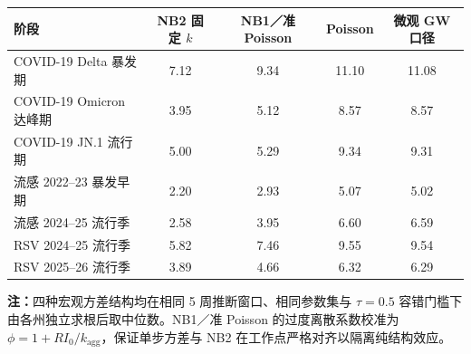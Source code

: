\begin{tabular}{lcccc}
\toprule
阶段 & NB2 固定 $k$ & NB1／准 Poisson & Poisson & 微观 GW 口径 \\
\midrule
COVID-19 Delta 暴发期 & 7.12 & 9.34 & 11.10 & 11.08 \\
COVID-19 Omicron 达峰期 & 3.95 & 5.12 & 8.57 & 8.57 \\
COVID-19 JN.1 流行期 & 5.00 & 5.29 & 9.34 & 9.31 \\
流感 2022--23 暴发早期 & 2.20 & 2.93 & 5.07 & 5.02 \\
流感 2024--25 流行季 & 2.58 & 3.95 & 6.60 & 6.59 \\
RSV 2024--25 流行季 & 5.82 & 7.46 & 9.55 & 9.54 \\
RSV 2025--26 流行季 & 3.89 & 4.66 & 6.32 & 6.29 \\
\bottomrule
\end{tabular}
\begin{flushleft}\scriptsize \textbf{注：}四种宏观方差结构均在相同 5 周推断窗口、相同参数集与 $\tau=0.5$ 容错门槛下由各州独立求根后取中位数。NB1／准 Poisson 的过度离散系数校准为 $\phi = 1 + R I_0 / k_{\text{agg}}$，保证单步方差与 NB2 在工作点严格对齐以隔离纯结构效应。\end{flushleft}
